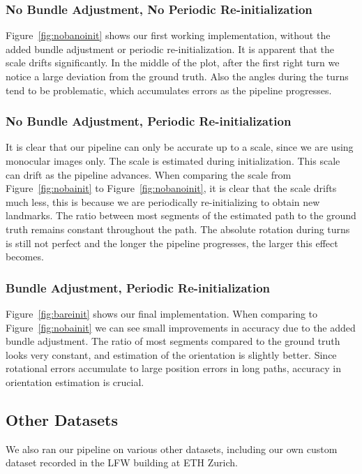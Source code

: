 \documentclass[11pt]{article}
\begin{document}
\subsubsection{No Bundle Adjustment, No Periodic Re-initialization}
Figure~\ref{fig:nobanoinit} shows our first working implementation, without the added bundle adjustment or periodic re-initialization. It is apparent that the scale drifts significantly. In the middle of the plot, after the first right turn we notice a large deviation from the ground truth. Also the angles during the turns tend to be problematic, which accumulates errors as the pipeline progresses.

\subsubsection{No Bundle Adjustment, Periodic Re-initialization}
It is clear that our pipeline can only be accurate up to a scale, since we are using monocular images only. The scale is estimated during initialization. This scale can drift as the pipeline advances. When comparing the scale from Figure~\ref{fig:nobainit} to Figure~\ref{fig:nobanoinit}, it is clear that the scale drifts much less, this is because we are periodically re-initializing to obtain new landmarks. The ratio between most segments of the estimated path to the ground truth remains constant throughout the path. The absolute rotation during turns is still not perfect and the longer the pipeline progresses, the larger this effect becomes.

\subsubsection{Bundle Adjustment, Periodic Re-initialization}
Figure~\ref{fig:bareinit} shows our final implementation. When comparing to Figure~\ref{fig:nobainit} we can see small improvements in accuracy due to the added bundle adjustment. The ratio of most segments compared to the ground truth looks very constant, and estimation of the orientation is slightly better. Since rotational errors accumulate to large position errors in long paths, accuracy in orientation estimation is crucial.

\subsection{Other Datasets}
We also ran our pipeline on various other datasets, including our own custom dataset recorded in the LFW building at ETH Zurich.
\end{document}
